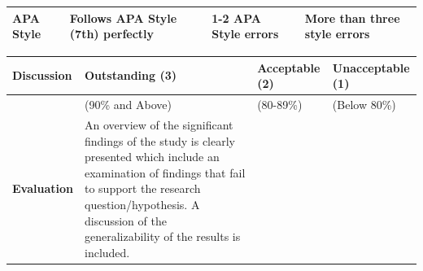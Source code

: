 \documentclass[
  openany]{book}
\begin{document}
\begin{longtable}[]{@{}llll@{}}
\begin{minipage}[t]{0.22\columnwidth}\raggedright
\textbf{APA Style}\strut
\end{minipage} & \begin{minipage}[t]{0.22\columnwidth}\raggedright
Follows APA Style (7th) perfectly\strut
\end{minipage} & \begin{minipage}[t]{0.22\columnwidth}\raggedright
1-2 APA Style errors\strut
\end{minipage} & \begin{minipage}[t]{0.22\columnwidth}\raggedright
More than three style errors\strut
\end{minipage}\tabularnewline
\bottomrule
\end{longtable}

\begin{longtable}[]{@{}llll@{}}
\toprule
\begin{minipage}[b]{0.22\columnwidth}\raggedright
Discussion\strut
\end{minipage} & \begin{minipage}[b]{0.22\columnwidth}\raggedright
Outstanding (3)\strut
\end{minipage} & \begin{minipage}[b]{0.22\columnwidth}\raggedright
Acceptable (2)\strut
\end{minipage} & \begin{minipage}[b]{0.22\columnwidth}\raggedright
Unacceptable (1)\strut
\end{minipage}\tabularnewline
\midrule
\endhead
\begin{minipage}[t]{0.22\columnwidth}\raggedright
\strut
\end{minipage} & \begin{minipage}[t]{0.22\columnwidth}\raggedright
(90\% and Above)\strut
\end{minipage} & \begin{minipage}[t]{0.22\columnwidth}\raggedright
(80-89\%)\strut
\end{minipage} & \begin{minipage}[t]{0.22\columnwidth}\raggedright
(Below 80\%)\strut
\end{minipage}\tabularnewline
\begin{minipage}[t]{0.22\columnwidth}\raggedright
\textbf{Evaluation}\strut
\end{minipage} & \begin{minipage}[t]{0.22\columnwidth}\raggedright
An overview of the significant findings of the study is clearly presented which include an examination of findings that fail to support the research question/hypothesis. A discussion of the generalizability of the results is included.\strut

\end{minipage}
\end{longtable}
\end{document}

